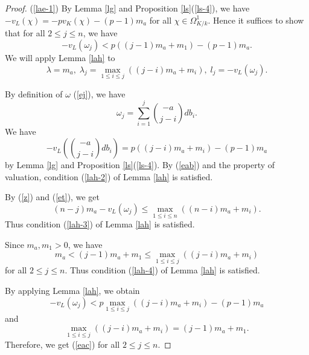\documentclass[10pt,a4paper]{amsart}
\numberwithin{equation}{section}
\theoremstyle{plain}
\theoremstyle{definition}
\begin{document}
\begin{proof}
  (\ref{lae-1}) By Lemma \ref{lg} and Proposition \ref{ls}(\ref{ls-4}), we have $-v_L(\chi)=-pv_K(\chi)-(p-1)m_a$ for all $\chi\in\Omega_{K/k}^1$. Hence it suffices to show that for all $2\leq j\leq n$, we have
  \begin{equation}\label{eac}
    -v_L(\omega_j)<p((j-1)m_a+m_1)-(p-1)m_a.
  \end{equation}
  We will apply Lemma \ref{lah} to
  \begin{equation}
  \lambda=m_a,\;\lambda_j=\max_{1\leq i\leq j}((j-i)m_a+m_{i}),\; l_j=-v_L(\omega_j).
  \end{equation}
  
  By definition of $\omega$ (\ref{ej}), we have
  \begin{equation}\label{eab}
  \omega_j=\sum_{i=1}^j\binom{-a}{j-i}db_i.
  \end{equation}
  We have
  \begin{equation}
    -v_L\left(\binom{-a}{j-i}db_i\right)=p((j-i)m_a+m_{i})-(p-1)m_a
  \end{equation}
   by Lemma \ref{lg} and Proposition \ref{ls}(\ref{ls-4}). By (\ref{eab}) and the property of valuation, condition (\ref{lah-2}) of Lemma \ref{lah} is satisfied.
  
  By (\ref{z}) and (\ref{et}), we get
  \begin{equation}
  (n-j)m_a-v_L(\omega_j)\leq\max_{1\leq i\leq n}((n-i)m_a+m_{i}).
  \end{equation}
  Thus condition (\ref{lah-3}) of Lemma \ref{lah} is satisfied.

  Since $m_a,m_1>0$, we have 
  \begin{equation}
  m_a<(j-1)m_a+m_1\leq\max_{1\leq i\leq j}((j-i)m_a+m_{i})
  \end{equation}
  for all $2\leq j\leq n$. Thus condition (\ref{lah-4}) of Lemma \ref{lah} is satisfied.

  By applying Lemma \ref{lah}, we obtain
  \begin{equation}
  -v_L(\omega_j)< p\max_{1\leq i\leq j}((j-i)m_a+m_i)-(p-1)m_a
  \end{equation}
  and 
  \begin{equation}
    \max_{1\leq i\leq j}((j-i)m_a+m_i)=(j-1)m_a+m_1.
  \end{equation}
  Therefore, we get (\ref{eac}) for all $2\leq j\leq n$.
  

\end{proof}
\end{document}
